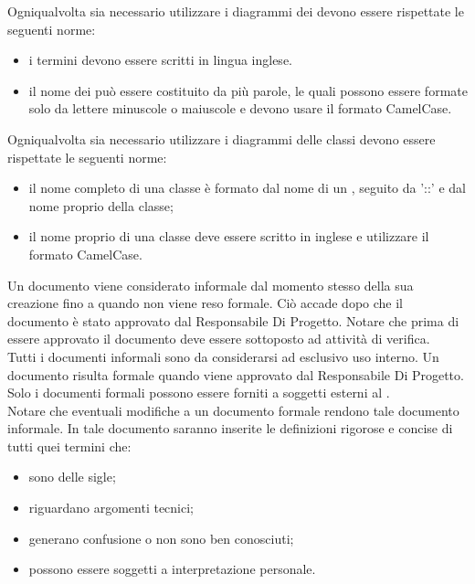 					Ogniqualvolta sia necessario utilizzare i diagrammi dei  devono essere rispettate le seguenti norme:
					\begin{itemize}
					\item i termini devono essere scritti in lingua inglese.
					\item il nome dei  può essere costituito da più parole, le quali possono essere formate solo da lettere minuscole o maiuscole e devono usare il formato CamelCase.
					\end{itemize}
					Ogniqualvolta sia necessario utilizzare i diagrammi delle classi devono essere rispettate le seguenti norme:
					\begin{itemize}
					\item il nome completo di una classe è formato dal nome di un , seguito da '::' e dal nome proprio della classe;
					\item il nome proprio di una classe deve essere scritto in inglese e utilizzare il formato CamelCase.
					\end{itemize}		
					Un documento viene considerato informale dal momento stesso della sua creazione fino a quando non viene reso formale. Ciò accade dopo che il documento è stato approvato dal Responsabile Di Progetto. Notare che prima di essere approvato il documento deve essere sottoposto ad attività di verifica.\\
					Tutti i documenti informali sono da considerarsi ad esclusivo uso interno.
					Un documento risulta formale quando viene approvato dal Responsabile Di Progetto. Solo i documenti formali possono essere forniti a soggetti esterni al .\\
					Notare che eventuali modifiche a un documento formale rendono tale documento informale.
					In tale documento saranno inserite le definizioni rigorose e concise di tutti quei termini che:
					\begin{itemize}
						\item sono delle sigle;
						\item riguardano argomenti tecnici;
						\item generano confusione o non sono ben conosciuti;
						\item possono essere soggetti a interpretazione personale.
					\end{itemize}
